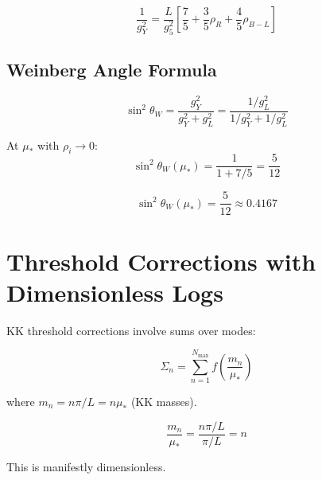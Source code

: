 \documentclass[11pt,a4paper]{article}
\theoremstyle{definition}
\begin{document}
\begin{equation}
\label{eq:gY_simplified}
\frac{1}{g_Y^2} = \frac{L}{g_5^2}\left[\frac{7}{5} + \frac{3}{5}\rho_R + \frac{4}{5}\rho_{B-L}\right]
\end{equation}

\subsection{Weinberg Angle Formula}
\label{subsec:weinberg}

\begin{equation}
\label{eq:sw2_general}
\sin^2\theta_W = \frac{g_Y^2}{g_Y^2 + g_L^2} = \frac{1/g_L^2}{1/g_Y^2 + 1/g_L^2}
\end{equation}

At $\mu_*$ with $\rho_i \to 0$:
\begin{equation}
\label{eq:sw2_limit}
\sin^2\theta_W(\mu_*) = \frac{1}{1 + 7/5} = \frac{5}{12}
\end{equation}

\begin{equation}
\label{eq:sw2_exact}
\sin^2\theta_W(\mu_*) = \frac{5}{12} \approx 0.4167
\end{equation}

\section{Threshold Corrections with Dimensionless Logs}
\label{sec:thresholds}

KK threshold corrections involve sums over modes:

\begin{equation}
\label{eq:kk_sum}
\Sigma_n = \sum_{n=1}^{N_{\text{max}}} f\left(\frac{m_n}{\mu_*}\right)
\end{equation}

where $m_n = n\pi/L = n\mu_*$ (KK masses).

\begin{equation}
\label{eq:kk_mass_ratio}
\frac{m_n}{\mu_*} = \frac{n\pi/L}{\pi/L} = n
\end{equation}

This is manifestly dimensionless.
\end{document}
